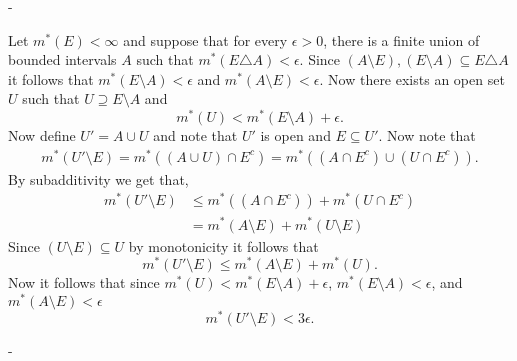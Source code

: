 \documentclass[12pt]{article}
\makeatletter
\theoremstyle{ex215}
\newcounter{probcount}
\newlength\probsep
\newlength\pshrinking
\newenvironment{problems}%
  {\ifhmode\unskip\par\fi\setcounter{probcount}{0}\probsep\parskip
  \sbox\@tempboxa{\textbf{9.}}\pshrinking\wd\@tempboxa\advance\pshrinking\labelsep
  \advance\linewidth -\pshrinking
  \advance\@totalleftmargin\pshrinking
  \advance\leftskip\pshrinking}%
  {\ifhmode\unskip \par\fi\advance\leftskip-\pshrinking}%
\renewenvironment{proof}[1][\proofname]{\par
  \pushQED{\qed}%
  \normalfont \topsep6\p@\@plus6\p@\relax
  \trivlist
  \@topsep \topsep
  \item[\hskip\labelsep
        \itshape
    #1\@addpunct{.}]\ignorespaces
}{%
  \popQED\endtrivlist\@endpefalse
}
\makeatother
\begin{document}
\begin{problems}
\begin{proof} Let $m^*(E) < \infty$ and suppose that for every $\epsilon > 0$, there is a finite union of bounded intervals $A$ such that $m^*(E \triangle A) < \epsilon$. Since $(A \setminus E),(E \setminus A) \subseteq E \triangle A$ it follows that $m^*(E \setminus A) < \epsilon$ and $m^*(A\setminus E) < \epsilon$. Now there exists an open set $U$ such that $U \supseteq E\setminus A$ and 
  \begin{equation*}
    m^*(U) < m^*(E \setminus A) + \epsilon. 
  \end{equation*}
  Now define $U' = A \cup U$ and note that $U'$ is open and $E \subseteq U'$. Now note that
  \begin{align*}
    m^*(U'\setminus E) = m^*((A \cup U) \cap E^c) = m^*((A\cap E^c) \cup (U\cap E^c) ).
  \end{align*}
  By subadditivity we get that, 
  \begin{align*}
    m^*(U'\setminus E) &\leq m^*((A\cap E^c)) +  m^*(U\cap E^c)\\
     &= m^*(A\setminus E) +  m^*(U\setminus E)
  \end{align*}
  Since $(U\setminus E) \subseteq U$ by monotonicity it follows that 
  \begin{equation*}
    m^*(U'\setminus E) \leq m^*(A\setminus E) + m^*(U).
  \end{equation*}
  Now it follows that since $ m^*(U) < m^*(E \setminus A) + \epsilon$, $m^*(E \setminus A) < \epsilon$, and $m^*(A\setminus E) < \epsilon$
  \begin{equation*}
    m^*(U'\setminus E) < 3 \epsilon.
  \end{equation*}





\end{proof}
  \vspace*{.15in}





\end{problems}
\end{document}
